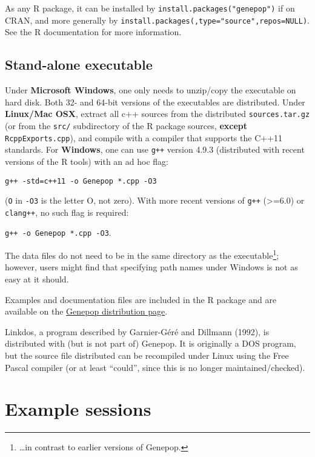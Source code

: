 \documentclass[12pt,]{book}
\let\rmarkdownfootnote\footnote%
\def\footnote{\protect\rmarkdownfootnote}
\theoremstyle{definition}
\theoremstyle{definition}
\theoremstyle{definition}
\theoremstyle{remark}
\begin{document}
As any R package, it can be installed by
\texttt{install.packages("genepop")} if on CRAN, and more generally by
\texttt{install.packages(}\texttt{,type="source",repos=NULL)}. See the R
documentation for more information.

\subsection{Stand-alone executable}\label{stand-alone-executable}

Under \textbf{Microsoft
Windows}, one only needs to
unzip/copy the executable on hard disk. Both 32- and 64-bit versions of
the executables are distributed. Under \textbf{Linux/Mac
OSX},  extract all c++ sources
from the distributed \texttt{sources.tar.gz} (or from the \texttt{src/}
subdirectory of the R package sources, \textbf{except}
\texttt{RcppExports.cpp}), and compile with a compiler that supports the
C++11 standards. For \textbf{Windows}, one can use \texttt{g++} version
4.9.3 (distributed with recent versions of the R tools) with an ad hoc
flag:

\texttt{g++\ -std=c++11\ -o\ Genepop\ *.cpp\ -O3}

(\texttt{O} in \texttt{-O3} is the letter O, not zero). With more recent
versions of \texttt{g++} (\textgreater{}=6.0) or \texttt{clang++}, no
such flag is required:

\texttt{g++\ -o\ Genepop\ *.cpp\ -O3}.

The data files do not need to be in the same directory as the
executable\footnote{\ldots{}in contrast to earlier versions of Genepop.};
however, users might find that specifying path names under Windows is
not as easy at it should.

Examples and documentation files are included in the R package and are
available on the
\href{http://kimura.univ-montp2.fr/~rousset/Genepop.htm}{Genepop
distribution page}.

Linkdos, a program described by Garnier-Géré and
Dillmann (1992), is distributed with (but is not part of) Genepop. It is
originally a DOS program, but the source file distributed can be
recompiled under Linux using the Free Pascal compiler (or at least
``could'', since this is no longer maintained/checked).

\section{Example sessions}\label{example-sessions}
\end{document}
